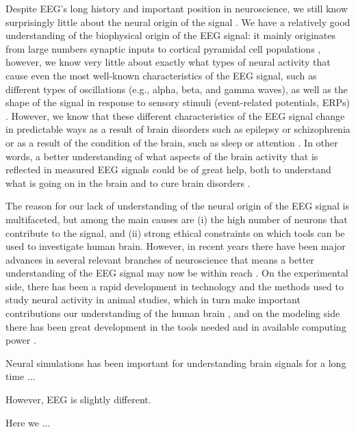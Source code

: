 \documentclass[preprint,10pt,authoryear]{elsarticle}
\begin{document}
Despite EEG's long history and important position in neuroscience, we still know surprisingly little about the neural origin of the signal \citep{COHEN2017}. We have a relatively good understanding of the biophysical origin of the EEG signal: it mainly originates from large numbers synaptic inputs to cortical pyramidal cell populations \citep{NUNEZ2006, Pesaran2018}, however, we know very little about exactly what types of neural activity that cause even the most well-known characteristics of the EEG signal, such as different types of oscillations (e.g., alpha, beta, and gamma waves), as well as the shape of the signal in response to sensory stimuli (event-related potentials, ERPs) \citep{COHEN2017}. However, we know that these different characteristics of the EEG signal change in predictable ways as a result of brain disorders such as epilepsy or schizophrenia \citep{Light2013, MAKI2019} or as a result of the condition of the brain, such as sleep or attention \citep{Klimesch1998}. In other words, a better understanding of what aspects of the brain activity that is reflected in measured EEG signals could be of great help, both to understand what is going on in the brain and to cure brain disorders \citep{MAKI2019}.

The reason for our lack of understanding of the neural origin of the EEG signal is multifaceted,
but among the main causes are (i) the high number of neurons that contribute to the signal, and (ii)
strong ethical constraints on which tools can be used to investigate human brain. However, in recent years there have been major advances in several relevant branches of neuroscience that means a better understanding of the EEG signal may now be within reach \citep{COHEN2017}. On the experimental side, there has been a rapid development in technology and the methods used to study neural activity in animal studies, which in turn make important contributions our understanding of the human brain \citep{SILVA2013, COHEN2017, Pesaran2018, BRUYNS2017}, and on the modeling side there has been great development
in the tools needed \citep{HAGEN2018} and in available computing power \citep{EINEVOLL2019}.

Neural simulations has been important for understanding brain signals for a long time ...

However, EEG is slightly different.

Here we ...
\end{document}
